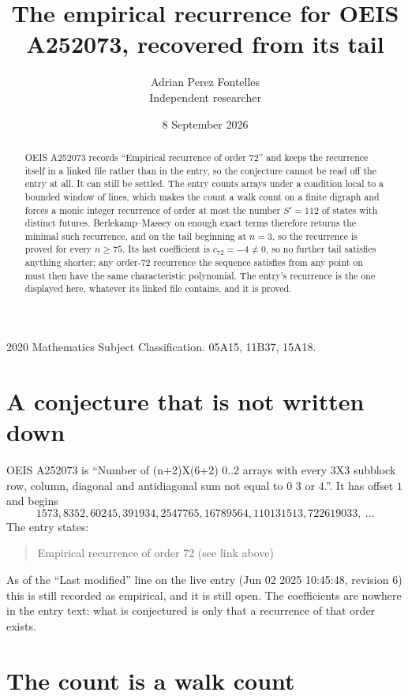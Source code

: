 \documentclass[11pt,a4paper]{article}
\title{The empirical recurrence for OEIS A252073, recovered from its tail}
\author{Adrian Perez Fontelles\\ \small Independent researcher}
\date{8 September 2026}
\theoremstyle{plain}
\theoremstyle{definition}
\begin{document}
\maketitle

\begin{abstract}
OEIS A252073 records ``Empirical recurrence of order $72$'' and keeps the recurrence itself in
a linked file rather than in the entry, so the conjecture cannot be read off the entry at all.
It can still be settled. The entry counts arrays under a condition local to a bounded window of
lines, which makes the count a walk count on a finite digraph and forces a monic integer
recurrence of order at most the number $S'=112$ of states with distinct futures. Berlekamp--Massey on
enough exact terms therefore returns the minimal such recurrence, and on the tail beginning at $n=3$, so the recurrence is proved for every $n\ge75$.
Its last coefficient is $c_{72}=-4\neq0$, so no further tail satisfies anything
shorter; any order-$72$ recurrence the sequence satisfies from any point on must then have
the same characteristic polynomial. The entry's recurrence is the one displayed here, whatever
its linked file contains, and it is proved.
\end{abstract}

\noindent\small 2020 Mathematics Subject Classification. 05A15, 11B37, 15A18.\normalsize

\section{A conjecture that is not written down}

OEIS A252073 is ``Number of (n+2)X(6+2) 0..2 arrays with every 3X3 subblock row, column, diagonal and antidiagonal sum not equal to 0 3 or 4.''. It has offset $1$ and begins
\[
1573, 8352, 60245, 391934, 2547765, 16789564, 110131513, 722619033,\ \dots
\]
The entry states:
\begin{quote}
Empirical recurrence of order 72 (see link above)
\end{quote}
As of the ``Last modified'' line on the live entry (Jun 02 2025 10:45:48, revision 6)
this is still recorded as empirical, and it is still open. The coefficients are nowhere in the
entry text: what is conjectured is only that a recurrence of that order exists.

\section{The count is a walk count}
\end{document}
